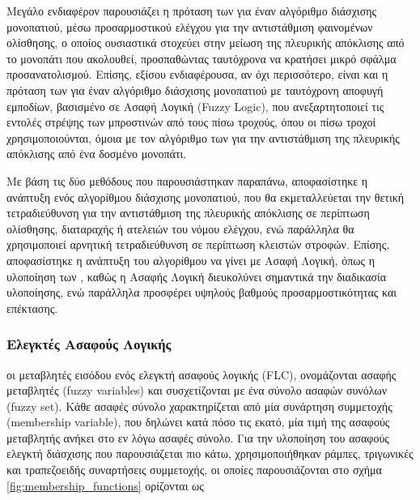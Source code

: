 \bigskip
Μεγάλο ενδιαφέρον παρουσιάζει η πρόταση των \citeauthor{offroad_adaptive_control} \cite{offroad_adaptive_control} για έναν αλγόριθμο διάσχισης μονοπατιού, μέσω προσαρμοστικού ελέγχου για την αντιστάθμιση φαινομένων ολίσθησης, ο οποίος ουσιαστικά στοχεύει στην μείωση της πλευρικής απόκλισης από το μονοπάτι που ακολουθεί, προσπαθώντας ταυτόχρονα να κρατήσει μικρό σφάλμα προσανατολισμού. Επίσης, εξίσου ενδιαφέρουσα, αν όχι περισσότερο, είναι και η πρόταση των \citeauthor{reactive_fuzzy_ptc} \cite{reactive_fuzzy_ptc} για έναν αλγόριθμο διάσχισης μονοπατιού με ταυτόχρονη αποφυγή εμποδίων, βασισμένο σε Ασαφή Λογική (Fuzzy Logic), που ανεξαρτητοποιεί τις εντολές στρέψης των μπροστινών από τους πίσω τροχούς, όπου οι πίσω τροχοί χρησιμοποιούνται, όμοια με τον αλγόριθμο των \cite{offroad_adaptive_control} \cite{offroad_adaptive_control} για την αντιστάθμιση της πλευρικής απόκλισης από ένα δοσμένο μονοπάτι.

\bigskip
Με βάση τις δύο μεθόδους που παρουσιάστηκαν παραπάνω, αποφασίστηκε η ανάπτυξη ενός αλγορίθμου διάσχισης μονοπατιού, που θα εκμεταλλεύεται την θετική τετραδιεύθυνση για την αντιστάθμιση της πλευρικής απόκλισης σε περίπτωση ολίσθησης, διαταραχής ή ατελειών του νόμου ελέγχου, ενώ παράλληλα θα χρησιμοποιεί αρνητική τετραδιεύθυνση σε περίπτωση κλειστών στροφών. Επίσης, αποφασίστηκε η ανάπτυξη του αλγορίθμου να γίνει με Ασαφή Λογική, όπως η υλοποίηση των \citeauthor{reactive_fuzzy_ptc} \cite{reactive_fuzzy_ptc}, καθώς η Ασαφής Λογική διευκολύνει σημαντικά την διαδικασία υλοποίησης, ενώ παράλληλα προσφέρει υψηλούς βαθμούς προσαρμοστικότητας και επέκτασης.

\subsubsection{Ελεγκτές Ασαφούς Λογικής} \label{sssec:fuzzy_controllers}
οι μεταβλητές εισόδου ενός ελεγκτή ασαφούς λογικής (FLC), ονομάζονται ασαφής μεταβλητές (fuzzy variables) και συσχετίζονται με ένα σύνολο ασαφών συνόλων (fuzzy set). Κάθε ασαφές σύνολο χαρακτηρίζεται από μία συνάρτηση συμμετοχής (membership variable), που δηλώνει κατά πόσο τις εκατό, μία τιμή της ασαφούς μεταβλητής ανήκει στο εν λόγω ασαφές σύνολο. Για την υλοποίηση του ασαφούς ελεγκτή διάσχισης που παρουσιάζεται πιο κάτω, χρησιμοποιήθηκαν ράμπες, τριγωνικές και τραπεζοειδής συναρτήσεις συμμετοχής, οι οποίες παρουσιάζονται στο σχήμα \ref{fig:membership_functions} ορίζονται ως

